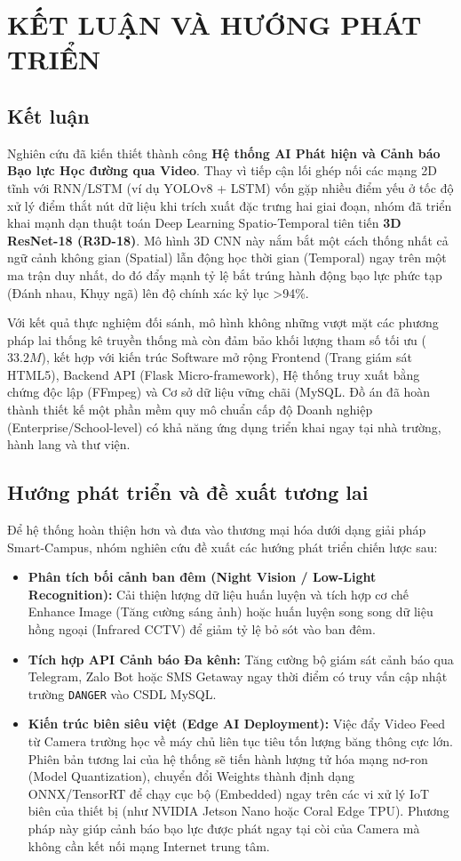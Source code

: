 \documentclass[conference]{IEEEtran}
\begin{document}
\section{KẾT LUẬN VÀ HƯỚNG PHÁT TRIỂN}
\subsection{Kết luận}
Nghiên cứu đã kiến thiết thành công \textbf{Hệ thống AI Phát hiện và Cảnh báo Bạo lực Học đường qua Video}. Thay vì tiếp cận lối ghép nối các mạng 2D tĩnh với RNN/LSTM (ví dụ YOLOv8 + LSTM) vốn gặp nhiều điểm yếu ở tốc độ xử lý điểm thắt nút dữ liệu khi trích xuất đặc trưng hai giai đoạn, nhóm đã triển khai mạnh dạn thuật toán Deep Learning Spatio-Temporal tiên tiến \textbf{3D ResNet-18 (R3D-18)}. Mô hình 3D CNN này nắm bắt một cách thống nhất cả ngữ cảnh không gian (Spatial) lẫn động học thời gian (Temporal) ngay trên một ma trận duy nhất, do đó đẩy mạnh tỷ lệ bắt trúng hành động bạo lực phức tạp (Đánh nhau, Khụy ngã) lên độ chính xác kỷ lục >94\%.

Với kết quả thực nghiệm đối sánh, mô hình không những vượt mặt các phương pháp lai thống kê truyền thống mà còn đảm bảo khối lượng tham số tối ưu ($33.2M$), kết hợp với kiến trúc Software mở rộng Frontend (Trang giám sát HTML5), Backend API (Flask Micro-framework), Hệ thống truy xuất bằng chứng độc lập (FFmpeg) và Cơ sở dữ liệu vững chãi (MySQL. Đồ án đã hoàn thành thiết kế một phần mềm quy mô chuẩn cấp độ Doanh nghiệp (Enterprise/School-level) có khả năng ứng dụng triển khai ngay tại nhà trường, hành lang và thư viện.

\subsection{Hướng phát triển và đề xuất tương lai}
Để hệ thống hoàn thiện hơn và đưa vào thương mại hóa dưới dạng giải pháp Smart-Campus, nhóm nghiên cứu đề xuất các hướng phát triển chiến lược sau:
\begin{itemize}
    \item \textbf{Phân tích bối cảnh ban đêm (Night Vision / Low-Light Recognition):} Cải thiện lượng dữ liệu huấn luyện và tích hợp cơ chế Enhance Image (Tăng cường sáng ảnh) hoặc huấn luyện song song dữ liệu hồng ngoại (Infrared CCTV) để giảm tỷ lệ bỏ sót vào ban đêm.
    \item \textbf{Tích hợp API Cảnh báo Đa kênh:} Tăng cường bộ giám sát cảnh báo qua Telegram, Zalo Bot hoặc SMS Getaway ngay thời điểm có truy vấn cập nhật trường \texttt{DANGER} vào CSDL MySQL.
    \item \textbf{Kiến trúc biên siêu việt (Edge AI Deployment):} Việc đẩy Video Feed từ Camera trường học về máy chủ liên tục tiêu tốn lượng băng thông cực lớn. Phiên bản tương lai của hệ thống sẽ tiến hành lượng tử hóa mạng nơ-ron (Model Quantization), chuyển đổi Weights thành định dạng ONNX/TensorRT để chạy cục bộ (Embedded) ngay trên các vi xử lý IoT biên của thiết bị (như NVIDIA Jetson Nano hoặc Coral Edge TPU). Phương pháp này giúp cảnh báo bạo lực được phát ngay tại còi của Camera mà không cần kết nối mạng Internet trung tâm.
\end{itemize}
\end{document}
